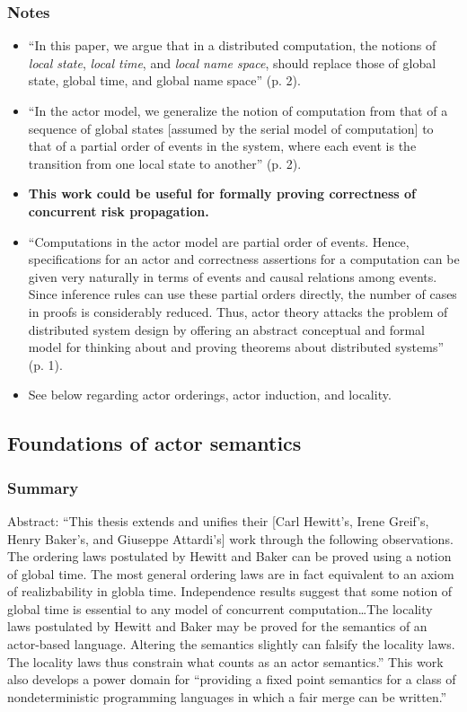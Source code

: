 \subsubsection*{Notes}
\begin{itemize}
\item ``In this paper, we argue that in a distributed computation, the notions of \emph{local state}, \emph{local time}, and \emph{local name space}, should replace those of global state, global time, and global name space'' (p. 2).
\item ``In the actor model, we generalize the notion of computation from that of a sequence of global states [assumed by the serial model of computation] to that of a partial order of events in the system, where each event is the transition from one local state to another'' (p. 2).
\item \textbf{This work could be useful for formally proving correctness of concurrent risk propagation.}
\item ``Computations in the actor model are partial order of events. Hence, specifications for an actor and correctness assertions for a computation can be given very naturally in terms of events and causal relations among events. Since inference rules can use these partial orders directly, the number of cases in proofs is considerably reduced. Thus, actor theory attacks the problem of distributed system design by offering an abstract conceptual and formal model for thinking about and proving theorems about distributed systems'' (p. 1).
\item See below regarding actor orderings, actor induction, and locality.
\end{itemize}
 

\subsection{Foundations of actor semantics}
\subsubsection*{Summary}
Abstract: ``This thesis extends and unifies their [Carl Hewitt's, Irene Greif's, Henry Baker's, and Giuseppe Attardi's] work through the following observations. The ordering laws postulated by Hewitt and Baker can be proved using a notion of global time. The most general ordering laws are in fact equivalent to an axiom of realizbability in globla time. Independence results suggest that some notion of global time is essential to any model of concurrent computation{\ldots}The locality laws postulated by Hewitt and Baker may be proved for the semantics of an actor-based language. Altering the semantics slightly can falsify the locality laws. The locality laws thus constrain what counts as an actor semantics.'' This work also develops a power domain for ``providing a fixed point semantics for a class of nondeterministic programming languages in which a fair merge can be written.''
